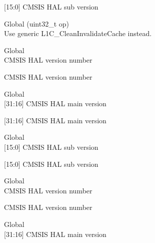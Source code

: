 \begin{DoxyRefList}
\label{deprecated__deprecated001231}%
%
\mbox{[}15\+:0\mbox{]} CMSIS HAL sub version  
\item[Global \doxylink{core__ca_8h_a88628cab0d9113dc46a509d6a4d96c58}{\+\_\+\+\_\+\+L1\+C\+\_\+\+Clean\+Invalidate\+Cache} (uint32\+\_\+t op)]\hfill \\
\label{deprecated__deprecated000661}%
%
Use generic L1\+C\+\_\+\+Clean\+Invalidate\+Cache instead.  
\item[Global \doxylink{_core_2_include_2core__sc000_8h_a794ed22b926ab39924705178f2441270}{\+\_\+\+\_\+\+SC000\+\_\+\+CMSIS\+\_\+\+VERSION} ]\hfill \\
\label{deprecated__deprecated000656}%
%
CMSIS HAL version number 

\label{deprecated__deprecated001334}%
%
CMSIS HAL version number  
\item[Global \doxylink{_core_2_include_2core__sc000_8h_a9cca46bbd181abedd1cd6e84ef0b3cf4}{\+\_\+\+\_\+\+SC000\+\_\+\+CMSIS\+\_\+\+VERSION\+\_\+\+MAIN} ]\hfill \\
\label{deprecated__deprecated000654}%
%
\mbox{[}31\+:16\mbox{]} CMSIS HAL main version 

\label{deprecated__deprecated001332}%
%
\mbox{[}31\+:16\mbox{]} CMSIS HAL main version  
\item[Global \doxylink{_core_2_include_2core__sc000_8h_af4db9bbe5ff5726d8a8c388e52d5685d}{\+\_\+\+\_\+\+SC000\+\_\+\+CMSIS\+\_\+\+VERSION\+\_\+\+SUB} ]\hfill \\
\label{deprecated__deprecated000655}%
%
\mbox{[}15\+:0\mbox{]} CMSIS HAL sub version 

\label{deprecated__deprecated001333}%
%
\mbox{[}15\+:0\mbox{]} CMSIS HAL sub version  
\item[Global \doxylink{_core_2_include_2core__sc300_8h_a2f960c3c99ab33e1cf4b5287821c44dd}{\+\_\+\+\_\+\+SC300\+\_\+\+CMSIS\+\_\+\+VERSION} ]\hfill \\
\label{deprecated__deprecated000659}%
%
CMSIS HAL version number 

\label{deprecated__deprecated001337}%
%
CMSIS HAL version number  
\item[Global \doxylink{_core_2_include_2core__sc300_8h_a0e2124db4f74f2b355904314accf1790}{\+\_\+\+\_\+\+SC300\+\_\+\+CMSIS\+\_\+\+VERSION\+\_\+\+MAIN} ]\hfill \\
\label{deprecated__deprecated000657}%
%
\mbox{[}31\+:16\mbox{]} CMSIS HAL main version 


\end{DoxyRefList}
